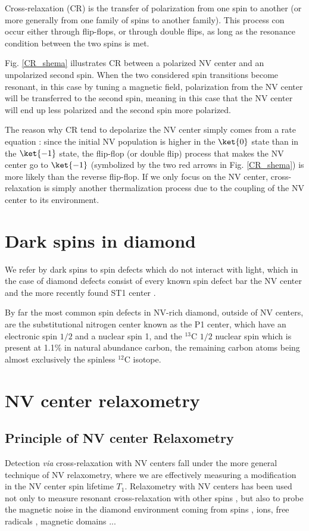 \documentclass[a4paper]{report}
\begin{document}
Cross-relaxation (CR) is the transfer of polarization from one spin to another (or more generally from one family of spins to another family). This process con occur either through flip-flops, or through double flips, as long as the resonance condition between the two spins is met. 

Fig. \ref{CR_shema} illustrates CR between a polarized NV center and an unpolarized second spin. When the two considered spin transitions become resonant, in this case by tuning a magnetic field, polarization from the NV center will be transferred to the second spin, meaning in this case that the NV center will end up less polarized and the second spin more polarized. 

The reason why CR tend to depolarize the NV center simply comes from a rate equation : since the initial NV population is higher in the $\ket{0}$ state than in the $\ket{-1}$ state, the flip-flop (or double flip) process that makes the NV center go to $\ket{-1}$ (symbolized by the two red arrows in Fig. \ref{CR_shema}) is more likely than the reverse flip-flop. If we only focus on the NV center, cross-relaxation is simply another thermalization process due to the coupling of the NV center to its environment.

\section{Dark spins in diamond}

We refer by dark spins to spin defects which do not interact with light, which in the case of diamond defects consist of every known spin defect bar the NV center and the more recently found ST1 center \citep{lee2013readout, john2017bright}.

By far the most common spin defects in NV-rich diamond, outside of NV centers, are the substitutional nitrogen center known as the P1 center, which have an electronic spin $1/2$ and a nuclear spin 1, and the $^13$C $1/2$ nuclear spin which is present at 1.1\% in natural abundance carbon, the remaining carbon atoms being almost exclusively the spinless $^12$C isotope. 

\section{NV center relaxometry}

\subsection{Principle of NV center Relaxometry}
Detection \textit{via} cross-relaxation	with NV centers fall under the more general technique of NV relaxometry, where we are effectively measuring a modification in the NV center spin lifetime $T_1$. Relaxometry with NV centers has been used not only to measure resonant cross-relaxation with other spins \citep{van1989cross,holliday1989optical,armstrong2010nv, hall2016detection,wickenbrock2016microwave,  wood2016wide,  alfasi2019detection, lazda2021cross}, but also to probe the magnetic noise in the diamond environment coming from spins \citep{steinert2013magnetic}, ions\citep{tetienne2013spin}, free radicals \citep{nie2021quantum}, magnetic domains \citep{finco2021imaging}...
\end{document}
